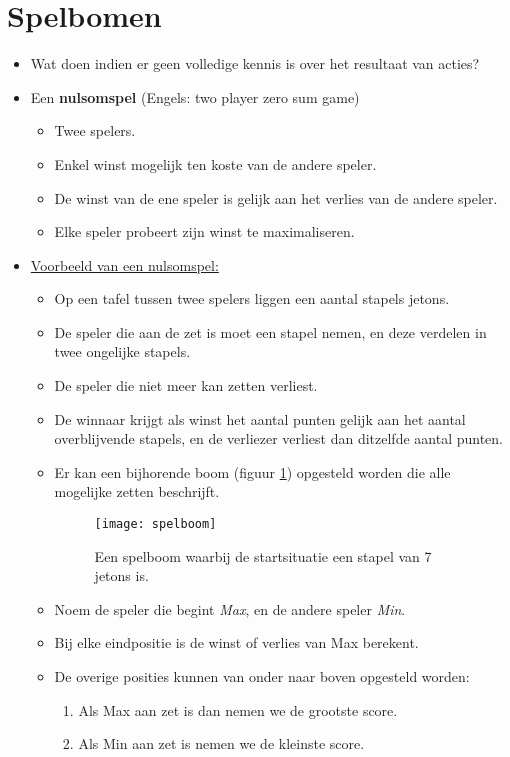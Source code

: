 \section{Spelbomen}
\begin{itemize}
	\item Wat doen indien er geen volledige kennis is over het resultaat van acties?
	\item Een \textbf{nulsomspel} (Engels: two player zero sum game)
	\begin{itemize}
		\item Twee spelers.
		\item Enkel winst mogelijk ten koste van de andere speler.
		\item De winst van de ene speler is gelijk aan het verlies van de andere speler.
		\item Elke speler probeert zijn winst te maximaliseren.
	\end{itemize}
	\item \underline{Voorbeeld van een nulsomspel:}
	\begin{itemize}
		\item Op een tafel tussen twee spelers liggen een aantal stapels jetons.
		\item De speler die aan de zet is moet een stapel nemen, en deze verdelen in twee ongelijke stapels.
		\item De speler die niet meer kan zetten verliest.
		\item De winnaar krijgt als winst het aantal punten gelijk aan het aantal overblijvende stapels, en de verliezer verliest dan ditzelfde aantal punten.
		\item Er kan een bijhorende boom (figuur \ref{fig:spelboom}) opgesteld worden die alle mogelijke zetten beschrijft.
		\begin{figure}
			\texttt{[image: spelboom]}
			\caption{Een spelboom waarbij de startsituatie een stapel van 7 jetons is.}
			\label{fig:spelboom}
		\end{figure}
		\item Noem de speler die begint \textit{Max}, en de andere speler \textit{Min}.
		\item Bij elke eindpositie is de winst of verlies van Max berekent.
		\item De overige posities kunnen van onder naar boven opgesteld worden:
		\begin{enumerate}
			\item Als Max aan zet is dan nemen we de grootste score.
			\item Als Min aan zet is nemen we de kleinste score.

\end{enumerate}
\end{itemize}
\end{itemize}
